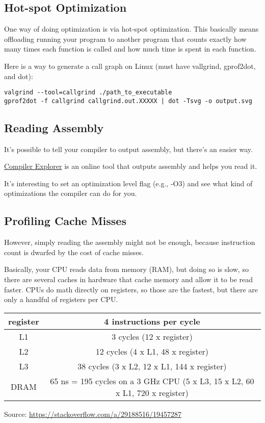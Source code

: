 \documentclass[letterpaper,11pt]{article}
\begin{document}
\subsection{Hot-spot Optimization}

One way of doing optimization is via hot-spot optimization. This basically means offloading running your program to another program that counts exactly how many times each function is called and how much time is spent in each function.

Here is a way to generate a call graph on Linux (must have vallgrind, gprof2dot, and dot):

\begin{verbatim}
valgrind --tool=callgrind ./path_to_executable
gprof2dot -f callgrind callgrind.out.XXXXX | dot -Tsvg -o output.svg
\end{verbatim}

\subsection{Reading Assembly}

It's possible to tell your compiler to output assembly, but there's an easier way.

\href{https://godbolt.org/}{Compiler Explorer} is an online tool that outputs assembly and helps you read it.

It's interesting to set an optimization level flag (e.g., -O3) and see what kind of optimizations the compiler can do 
for you.


\subsection{Profiling Cache Misses}

However, simply reading the assembly might not be enough, because instruction count is dwarfed by the cost of cache misses. 

Basically, your CPU reads data from memory (RAM), but doing so is slow, so there are several caches in hardware
that cache memory and allow it to be read faster. CPUs do math directly on registers, so those 
are the fastest, but there are only a handful of registers per CPU.

\begin{center}
\begin{tabular}{ |c|c| }
\hline
register & 4 instructions per cycle \\ 
\hline
L1       & 3 cycles (12 x register) \\
\hline
L2       & 12 cycles (4 x L1, 48 x register) \\
\hline
L3       & 38 cycles (3 x L2, 12 x L1, 144 x register) \\
\hline
DRAM     & 65 ns = 195 cycles on a 3 GHz CPU (5 x L3, 15 x L2, 60 x L1, 720 x register) \\
\hline
\end{tabular}
\end{center}
Source: \url{https://stackoverflow.com/a/29188516/19457287}
\end{document}
